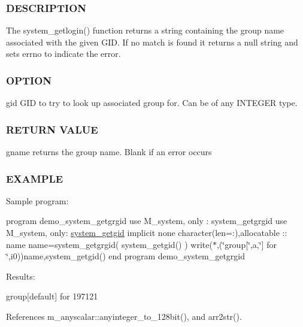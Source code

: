 \subsubsection*{D\+E\+S\+C\+R\+I\+P\+T\+I\+ON}

\begin{DoxyVerb}The system_getlogin() function returns a string containing the group
name associated with the given GID. If no match is found
it returns a null string and sets errno to indicate the error.
\end{DoxyVerb}


\subsubsection*{O\+P\+T\+I\+ON}

gid G\+ID to try to look up associated group for. Can be of any I\+N\+T\+E\+G\+ER type.

\subsubsection*{R\+E\+T\+U\+RN V\+A\+L\+UE}

gname returns the group name. Blank if an error occurs

\subsubsection*{E\+X\+A\+M\+P\+LE}

Sample program\+:

program demo\+\_\+system\+\_\+getgrgid use M\+\_\+system, only \+: system\+\_\+getgrgid use M\+\_\+system, only\+: \hyperlink{interfacem__system_1_1system__getgid}{system\+\_\+getgid} implicit none character(len=\+:),allocatable \+:\+: name name=system\+\_\+getgrgid( system\+\_\+getgid() ) write($\ast$,\textquotesingle{}(\char`\"{}group\mbox{[}\char`\"{},a,\char`\"{}\mbox{]} for \char`\"{},i0)\textquotesingle{})name,system\+\_\+getgid() end program demo\+\_\+system\+\_\+getgrgid

Results\+:

group\mbox{[}default\mbox{]} for 197121 

References m\+\_\+anyscalar\+::anyinteger\+\_\+to\+\_\+128bit(), and arr2str().

\mbox{\label{namespacem__system_a96fab225737afb77ff1cbba9866f0d05}} 
